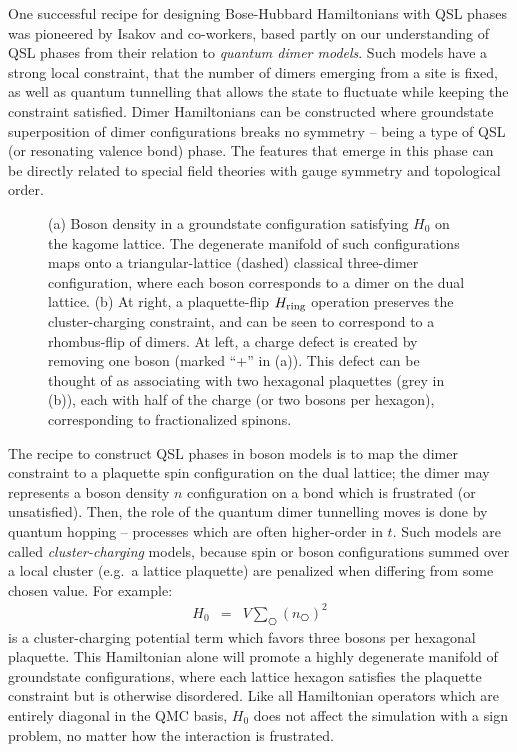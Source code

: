 \documentclass[range]{ar2e}
\begin{document}
One successful recipe for designing Bose-Hubbard Hamiltonians with QSL phases was pioneered by Isakov and co-workers,\cite{Isakov1, Isakov2, TopoEE} based partly on our understanding of QSL phases from their relation to {\it quantum dimer models}.  Such models have a strong local constraint, that the number of dimers emerging from a site is fixed, as well as quantum tunnelling that allows the state to fluctuate while keeping the constraint satisfied.  Dimer Hamiltonians can be constructed where groundstate superposition of dimer configurations breaks no symmetry -- being a type of QSL (or resonating valence bond) phase.  The features that emerge in this phase can be directly related to special field theories with gauge symmetry and topological order.


\begin{figure}
  \caption{ (a) Boson density in a groundstate configuration satisfying $H_0$ on the kagome lattice.  The degenerate manifold of such configurations maps onto a triangular-lattice (dashed) classical three-dimer configuration, where each boson corresponds to a dimer on the dual lattice.  (b) At right, a plaquette-flip $H_{\rm ring}$ operation preserves the cluster-charging constraint, and can be seen to correspond to a rhombus-flip of dimers.  At left, a charge defect is created by removing one boson (marked ``+'' in (a)).  This defect can be thought of as associating with two hexagonal plaquettes (grey in (b)), each with half of the charge (or two bosons per hexagon), corresponding to fractionalized spinons.} \label{kag_fig}
\end{figure}

The recipe to construct QSL phases in boson models is to map the dimer constraint to a plaquette spin configuration on the dual lattice; the dimer may represents a boson density $n$ configuration on a bond which is frustrated (or unsatisfied).  Then, the role of the quantum dimer tunnelling moves is done by quantum hopping -- processes which are often higher-order in $t$.  Such models are called
{\it cluster-charging} models,\cite{Isakov2} because spin or boson configurations summed over a local cluster (e.g.~a lattice plaquette) are penalized when differing from some chosen value.  For example:
\begin{eqnarray}
H_0 &=& V \sum_{\hexagon} (n_{\hexagon})^2 
\end{eqnarray}
is a cluster-charging potential term which favors three bosons per hexagonal plaquette.  This Hamiltonian alone will promote a highly degenerate manifold of groundstate configurations, where each lattice hexagon satisfies the plaquette constraint but is otherwise disordered.  
Like all Hamiltonian operators which are entirely diagonal in the QMC basis, $H_0$ does not affect the simulation with a sign problem, no matter how the interaction is frustrated.
\end{document}
